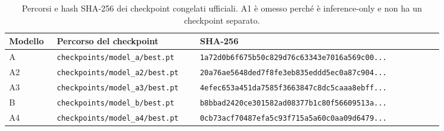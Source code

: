 \begin{table}[H]
\centering
\scriptsize
\caption{Percorsi e hash SHA-256 dei checkpoint congelati ufficiali.  A1 è omesso perché è inference-only e non ha un checkpoint separato.}
\label{tab:checkpoint-inventory}
\begin{tabular}{p{0.10\linewidth}p{0.30\linewidth}p{0.51\linewidth}}
\toprule
Modello & Percorso del checkpoint & SHA-256 \\
\midrule
A & \texttt{checkpoints/model\_a/best.pt} & \texttt{1a72d0b6f675b50c829d76c63343e7016a569c00...} \\
A2 & \texttt{checkpoints/model\_a2/best.pt} & \texttt{20a76ae5648ded7f8fe3eb835eddd5ec0a87c904...} \\
A3 & \texttt{checkpoints/model\_a3/best.pt} & \texttt{4efec653a451da7585f3663847c8dc5caaa8ebff...} \\
B & \texttt{checkpoints/model\_b/best.pt} & \texttt{b8bbad2420ce301582ad08377b1c80f56609513a...} \\
A4 & \texttt{checkpoints/model\_a4/best.pt} & \texttt{0cb73acf70487efa5c93f715a5a60c0aa09d6479...} \\
\bottomrule
\end{tabular}
\end{table}

